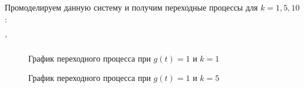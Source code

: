 \documentclass[a4paper, 11pt]{article}
\begin{document}
\par 
Промоделируем данную систему и получим переходные процессы для $k = 1, 5, 10$:

'\begin{figure}[h!]
\caption{График переходного процесса при $g(t) = 1$ и $k = 1$}
\label{ris:image}
\end{figure}

\newpage
\begin{figure}[h!]
\caption{График переходного процесса при $g(t) = 1$ и $k = 5$}
\label{ris:image}
\end{figure}
\end{document}
